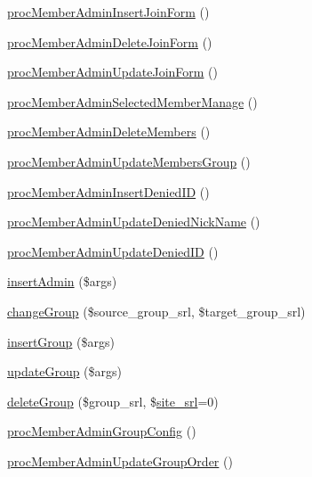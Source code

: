 \begin{DoxyCompactItemize}
\hyperlink{classmemberAdminController_a6b1e886dc7e03b2bd91be9f79c9813ad}{proc\+Member\+Admin\+Insert\+Join\+Form} ()
\item 
\hyperlink{classmemberAdminController_a0f31e7762e615b195d826f24d87a4f68}{proc\+Member\+Admin\+Delete\+Join\+Form} ()
\item 
\hyperlink{classmemberAdminController_a7ace7e29b0cb0b6108ace990e9c9ec27}{proc\+Member\+Admin\+Update\+Join\+Form} ()
\item 
\hyperlink{classmemberAdminController_ab80e03747fc4079068d0ed6a086fbd8f}{proc\+Member\+Admin\+Selected\+Member\+Manage} ()
\item 
\hyperlink{classmemberAdminController_a1c84f5c32acd6c0fada7806c179108df}{proc\+Member\+Admin\+Delete\+Members} ()
\item 
\hyperlink{classmemberAdminController_a5d65dac896cd8e9772a9f41d34a540b1}{proc\+Member\+Admin\+Update\+Members\+Group} ()
\item 
\hyperlink{classmemberAdminController_a58c482d52edd1fc9d61fd5111084586b}{proc\+Member\+Admin\+Insert\+Denied\+ID} ()
\item 
\hyperlink{classmemberAdminController_aa24edd8acdc15ea463a721b0dd3afe45}{proc\+Member\+Admin\+Update\+Denied\+Nick\+Name} ()
\item 
\hyperlink{classmemberAdminController_a469f2b07b7c5adffc62c9dbf71680d32}{proc\+Member\+Admin\+Update\+Denied\+ID} ()
\item 
\hyperlink{classmemberAdminController_ae2e8fdc055d7a9cc3b5eff067a709544}{insert\+Admin} (\$args)
\item 
\hyperlink{classmemberAdminController_a88f20939ad4a39bbc3026de341d3a703}{change\+Group} (\$source\+\_\+group\+\_\+srl, \$target\+\_\+group\+\_\+srl)
\item 
\hyperlink{classmemberAdminController_ae8edaf7da4fddd6079083be5f94d2b36}{insert\+Group} (\$args)
\item 
\hyperlink{classmemberAdminController_a7a0ee41a6c2feb436959ab1fcfbb0c7c}{update\+Group} (\$args)
\item 
\hyperlink{classmemberAdminController_a94b25f3fd554ca2cf669cc9749a3275a}{delete\+Group} (\$group\+\_\+srl, \$\hyperlink{ko_8install_8php_a8b1406b4ad1048041558dce6bfe89004}{site\+\_\+srl}=0)
\item 
\hyperlink{classmemberAdminController_a3f05ea4475dfc91d5252ed38d2cac10a}{proc\+Member\+Admin\+Group\+Config} ()
\item 
\hyperlink{classmemberAdminController_abadf39e3363281d5b04444aec0801a2b}{proc\+Member\+Admin\+Update\+Group\+Order} ()

\end{DoxyCompactItemize}
